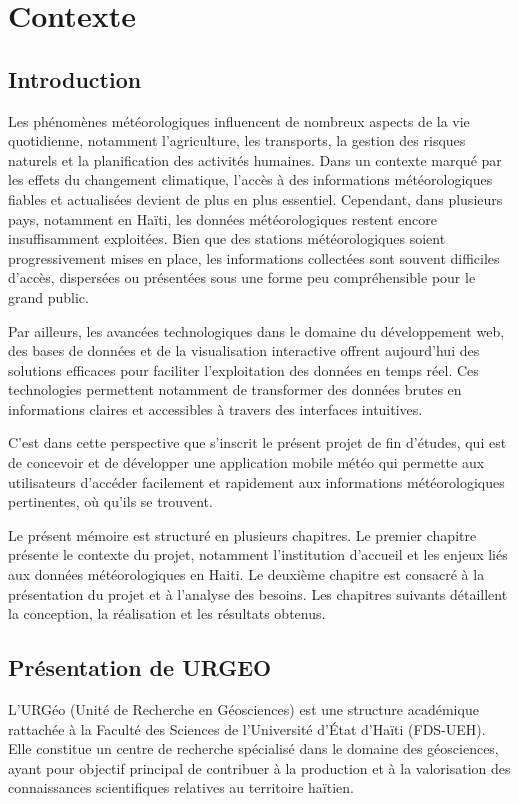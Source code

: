 
\chapter{Contexte}


\section{Introduction}
Les phénomènes météorologiques influencent de nombreux aspects de la vie quotidienne, notamment l’agriculture, les transports, la gestion des risques naturels et la planification des activités humaines. Dans un contexte marqué par les effets du changement climatique, l’accès à des informations météorologiques fiables et actualisées devient de plus en plus essentiel. Cependant, dans plusieurs pays, notamment en Haïti, les données météorologiques restent encore insuffisamment exploitées. Bien que des stations météorologiques soient progressivement mises en place, les informations collectées sont souvent difficiles d’accès, dispersées ou présentées sous une forme peu compréhensible pour le grand public.

\noindent Par ailleurs, les avancées technologiques dans le domaine du développement web, des bases de données et de la visualisation interactive offrent aujourd’hui des solutions efficaces pour faciliter l’exploitation des données en temps réel. Ces technologies permettent notamment de transformer des données brutes en informations claires et accessibles à travers des interfaces intuitives.

\noindent C’est dans cette perspective que s’inscrit le présent projet de fin d’études, qui est de concevoir et de développer une application mobile météo qui permette aux utilisateurs d'accéder facilement 
et rapidement aux informations météorologiques pertinentes, où qu'ils se trouvent.

\noindent Le présent mémoire est structuré en plusieurs chapitres. Le premier chapitre présente le contexte du projet, notamment l’institution d’accueil et les enjeux liés aux données météorologiques en Haiti. Le deuxième chapitre est consacré à la présentation du projet et à l’analyse des besoins. Les chapitres suivants détaillent la conception, la réalisation et les résultats obtenus.
\newpage

\section{Présentation de URGEO}
L’URGéo (Unité de Recherche en Géosciences) est une structure académique rattachée à la Faculté des Sciences de l’Université d’État d’Haïti (FDS-UEH). Elle constitue un centre de recherche spécialisé dans le domaine des géosciences, ayant pour objectif principal de contribuer à la production et à la valorisation des connaissances scientifiques relatives au territoire haïtien.

